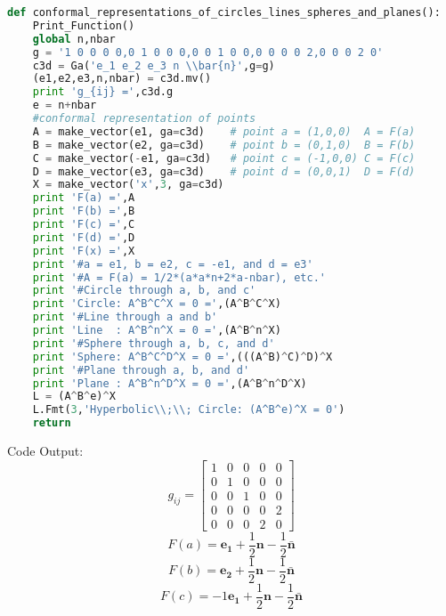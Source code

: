 \documentclass[10pt,fleqn]{report}
\begin{document}
\begin{lstlisting}[language=Python,showspaces=false,showstringspaces=false,backgroundcolor=\color{gray},frame=single]
def conformal_representations_of_circles_lines_spheres_and_planes():
    Print_Function()
    global n,nbar
    g = '1 0 0 0 0,0 1 0 0 0,0 0 1 0 0,0 0 0 0 2,0 0 0 2 0'
    c3d = Ga('e_1 e_2 e_3 n \\bar{n}',g=g)
    (e1,e2,e3,n,nbar) = c3d.mv()
    print 'g_{ij} =',c3d.g
    e = n+nbar
    #conformal representation of points
    A = make_vector(e1, ga=c3d)    # point a = (1,0,0)  A = F(a)
    B = make_vector(e2, ga=c3d)    # point b = (0,1,0)  B = F(b)
    C = make_vector(-e1, ga=c3d)   # point c = (-1,0,0) C = F(c)
    D = make_vector(e3, ga=c3d)    # point d = (0,0,1)  D = F(d)
    X = make_vector('x',3, ga=c3d)
    print 'F(a) =',A
    print 'F(b) =',B
    print 'F(c) =',C
    print 'F(d) =',D
    print 'F(x) =',X
    print '#a = e1, b = e2, c = -e1, and d = e3'
    print '#A = F(a) = 1/2*(a*a*n+2*a-nbar), etc.'
    print '#Circle through a, b, and c'
    print 'Circle: A^B^C^X = 0 =',(A^B^C^X)
    print '#Line through a and b'
    print 'Line  : A^B^n^X = 0 =',(A^B^n^X)
    print '#Sphere through a, b, c, and d'
    print 'Sphere: A^B^C^D^X = 0 =',(((A^B)^C)^D)^X
    print '#Plane through a, b, and d'
    print 'Plane : A^B^n^D^X = 0 =',(A^B^n^D^X)
    L = (A^B^e)^X
    L.Fmt(3,'Hyperbolic\\;\\; Circle: (A^B^e)^X = 0')
    return
\end{lstlisting}
Code Output:
\begin{equation*} g_{ij} = \left[\begin{matrix}1 & 0 & 0 & 0 & 0\\0 & 1 & 0 & 0 & 0\\0 & 0 & 1 & 0 & 0\\0 & 0 & 0 & 0 & 2\\0 & 0 & 0 & 2 & 0\end{matrix}\right] \end{equation*}
\begin{equation*} F(a) =  \boldsymbol{e_{1}} + \frac{1}{2} \boldsymbol{n} - \frac{1}{2} \boldsymbol{\bar{n}} \end{equation*}
\begin{equation*} F(b) =  \boldsymbol{e_{2}} + \frac{1}{2} \boldsymbol{n} - \frac{1}{2} \boldsymbol{\bar{n}} \end{equation*}
\begin{equation*} F(c) = -1 \boldsymbol{e_{1}} + \frac{1}{2} \boldsymbol{n} - \frac{1}{2} \boldsymbol{\bar{n}} \end{equation*}
\end{document}

